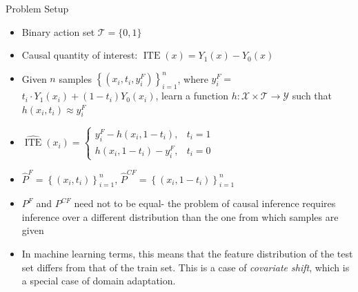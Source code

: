\documentclass{beamer}
\begin{document}
	\begin{frame}{Problem Setup}
		\begin{itemize}
			\item Binary action set $\mathcal{T}=\{0,1\}$
			\item Causal quantity of interest: $\operatorname{ITE}(x) = Y_{1}(x)-Y_{0}(x)$
			\item Given  $n$ samples $\left\{\left(x_{i}, t_{i}, y_{i}^{F}\right)\right\}_{i=1}^{n}$, where $y_{i}^{F}=$ $t_{i} \cdot Y_{1}\left(x_{i}\right)+\left(1-t_{i}\right) Y_{0}\left(x_{i}\right)$, learn a function $h: \mathcal{X} \times \mathcal{T} \rightarrow \mathcal{Y}$ such that $h\left(x_{i}, t_{i}\right) \approx y_{i}^{F}$
			\item $\hat{\operatorname{ITE}}\left(x_{i}\right)= \begin{cases}y_{i}^{F}-h\left(x_{i}, 1-t_{i}\right), & t_{i}=1 \\ h\left(x_{i}, 1-t_{i}\right)-y_{i}^{F}, & t_{i}=0\end{cases}$
			\item $\hat{P}^{F}=\left\{\left(x_{i}, t_{i}\right)\right\}_{i=1}^{n}$, $\hat{P}^{C F}=\left\{\left(x_{i}, 1-t_{i}\right)\right\}_{i=1}^{n}$
			\item $P^{F}$ and $P^{C F}$ need not to be equal-  the problem of causal inference requires inference over a different
			distribution than the one from which samples are given
			\item In machine learning terms, this means that the feature distribution of the test set differs from that of the train set. This
			is a case of \textit{covariate shift}, which is a special case of domain adaptation.
		\end{itemize}
	\end{frame}
\end{document}
